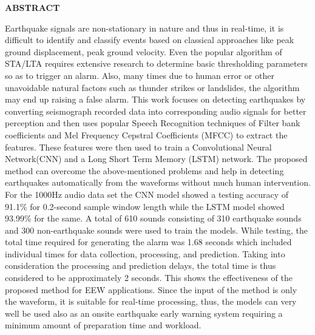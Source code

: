 \vspace{2cm}
\begin{center}
    \Large\textbf{ABSTRACT}
\end{center}

\vspace{1cm}

\fontsize{12pt}{18pt}\selectfont
 Earthquake signals are non-stationary in nature and thus in real-time, it is difficult to identify and classify events based on classical approaches like peak ground displacement, peak ground velocity. Even the popular algorithm of STA/LTA requires extensive research to determine basic thresholding parameters so as to trigger an alarm. Also, many times due to human error or other unavoidable natural factors such as thunder strikes or landslides, the algorithm may end up raising a false alarm. This work focuses on detecting earthquakes by converting seismograph recorded data into corresponding audio signals for better perception and then uses popular Speech Recognition techniques of Filter bank coefficients and Mel Frequency Cepstral Coefficients (MFCC) to extract the features. These features
 were then used to train a Convolutional Neural Network(CNN) and a Long Short Term Memory
 (LSTM) network. The proposed method can overcome the above-mentioned problems and help in
 detecting earthquakes automatically from the waveforms without much human intervention. For the 1000Hz audio data set the CNN model showed a testing accuracy of 91.1\% for 0.2-second sample  window length while the LSTM model showed 93.99\% for the same. A total of 610 sounds consisting of 310 earthquake sounds and 300 non-earthquake sounds were used to train the models. While testing, the total time required for generating the alarm was 1.68 seconds which included individual times for data collection, processing, and prediction. Taking into consideration the processing and prediction delays, the total time is thus considered to be approximately 2 seconds. This shows the effectiveness of the proposed method for EEW applications. Since the input of the method is only the waveform, it is suitable for real-time processing, thus, the models can very well be used also as an onsite earthquake early warning system requiring a minimum amount of preparation time and workload.


